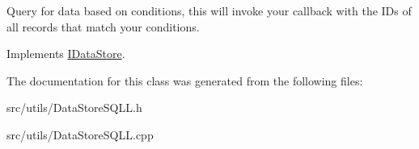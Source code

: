 Query for data based on conditions, this will invoke your callback with the ID\textquotesingle{}s of all records that match your conditions. 

Implements \hyperlink{class_i_data_store_aa3e9e7b57b40b3c7ff2bd11c9f9b9bf7}{I\+Data\+Store}.



The documentation for this class was generated from the following files\+:\begin{DoxyCompactItemize}
\item 
src/utils/Data\+Store\+S\+Q\+L\+L.\+h\item 
src/utils/Data\+Store\+S\+Q\+L\+L.\+cpp\end{DoxyCompactItemize}
